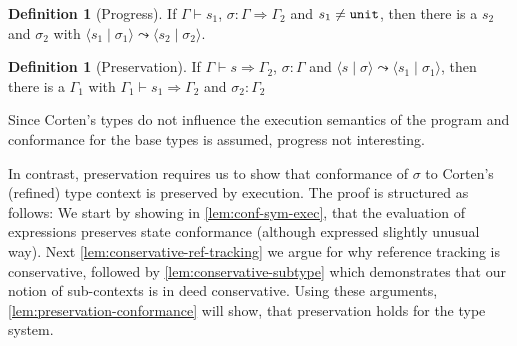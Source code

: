 \documentclass[twoside, english]{sdqthesis}
\newcommand{\tuple}[2]{\langle #1 \mid #2 \rangle}
\theoremstyle{definition}
\newtheorem{definition}[theorem]{Definition}
\begin{document}

\begin{definition}[Progress]
    If $\Gamma \vdash s_1$, $\sigma : \Gamma \Rightarrow \Gamma_2$ and $s_1 \neq \code{unit}$, then there is a $s_2$ and $\sigma_2$ with $\tuple{s_1}{\sigma_1} \leadsto \tuple{s_2}{\sigma_2}$.
\end{definition}

\begin{definition}[Preservation]
  If $\Gamma \vdash s \Rightarrow \Gamma_2$, $\sigma : \Gamma$ and $\tuple{s}{\sigma} \leadsto \tuple{s_1}{\sigma_1}$, then there is a $\Gamma_1$ with $\Gamma_1 \vdash s_1 \Rightarrow \Gamma_2$ and $\sigma_2 : \Gamma_2$
\end{definition}

Since Corten's types do not influence the execution semantics of the program and conformance for the base types is assumed, progress not interesting.

In contrast, preservation requires us to show that conformance of $\sigma$ to Corten's (refined) type context is preserved by execution. The proof is structured as follows: We start by showing in \cref{lem:conf-sym-exec}, that the evaluation of expressions preserves state conformance (although expressed slightly unusual way). 
Next \cref{lem:conservative-ref-tracking} we argue for why reference tracking is conservative, followed by \cref{lem:conservative-subtype} which demonstrates that our notion of sub-contexts is in deed conservative. Using these arguments, \cref{lem:preservation-conformance} will show, that preservation holds for the type system.
\end{document}
